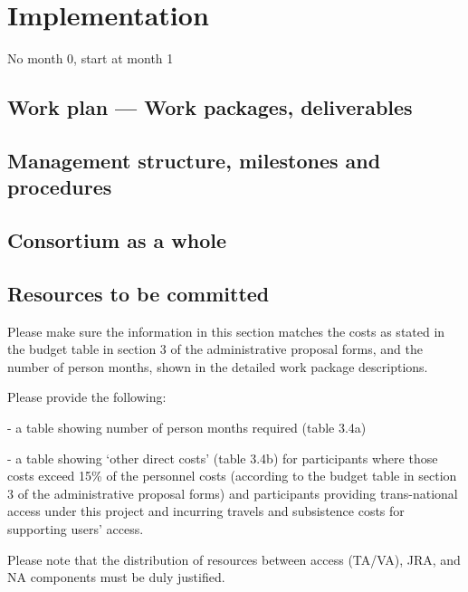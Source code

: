 \chapter{Implementation}\label{chap:implementation}

{\color{red} No month 0, start at month 1}

\section{Work plan --- Work packages, deliverables}



\section{Management structure, milestones and procedures}



\section{Consortium as a whole}\label{sec:consortium}



\section{Resources to be committed}\label{sec:resources}

\begin{todo}{}\color{red}
Please make sure the information in this section matches the costs as stated in the budget table in section 3 of the administrative proposal forms, and the number of person months, shown in the detailed work package descriptions.

Please provide the following:

- a table showing number of person months required (table 3.4a)

- a table showing ‘other direct costs’ (table 3.4b) for participants where those  costs exceed 15\% of the personnel costs (according to the budget  table in section 3 of the administrative proposal forms) and participants providing trans-national access under this project and incurring travels and subsistence costs for supporting users' access.

Please note that the distribution of resources between access (TA/VA), JRA, and NA components must be duly justified.
\end{todo}

